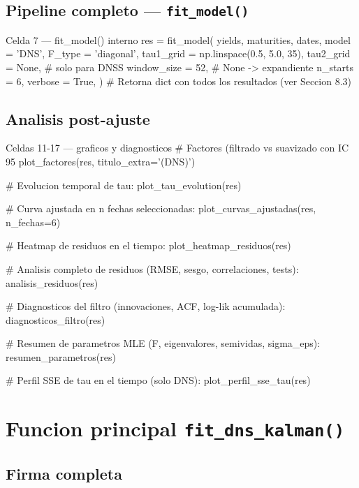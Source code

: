 \documentclass[12pt, a4paper]{article}
\theoremstyle{plain}
\theoremstyle{definition}
\theoremstyle{remark}
\begin{document}
\subsection{Pipeline completo --- \texttt{fit\_model()}}

\begin{codigocaja}{Celda 7 --- fit\_model() interno}
res = fit_model(
    yields, maturities, dates,
    model       = 'DNS',
    F_type      = 'diagonal',
    tau1_grid   = np.linspace(0.5, 5.0, 35),
    tau2_grid   = None,          # solo para DNSS
    window_size = 52,            # None -> expandiente
    n_starts    = 6,
    verbose     = True,
)
# Retorna dict con todos los resultados (ver Seccion 8.3)
\end{codigocaja}

\subsection{Analisis post-ajuste}

\begin{codigocaja}{Celdas 11-17 --- graficos y diagnosticos}
# Factores (filtrado vs suavizado con IC 95%
plot_factores(res, titulo_extra='(DNS)')

# Evolucion temporal de tau:
plot_tau_evolution(res)

# Curva ajustada en n fechas seleccionadas:
plot_curvas_ajustadas(res, n_fechas=6)

# Heatmap de residuos en el tiempo:
plot_heatmap_residuos(res)

# Analisis completo de residuos (RMSE, sesgo, correlaciones, tests):
analisis_residuos(res)

# Diagnosticos del filtro (innovaciones, ACF, log-lik acumulada):
diagnosticos_filtro(res)

# Resumen de parametros MLE (F, eigenvalores, semividas, sigma_eps):
resumen_parametros(res)

# Perfil SSE de tau en el tiempo (solo DNS):
plot_perfil_sse_tau(res)
\end{codigocaja}

\section{Funcion principal \texttt{fit\_dns\_kalman()}}
\label{sec:fit}

\subsection{Firma completa}
\end{document}
